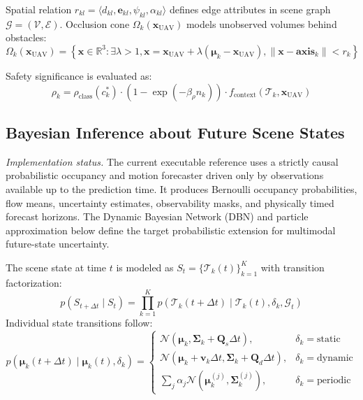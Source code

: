 Spatial relation $r_{kl} = \langle d_{kl}, \mathbf{e}_{kl}, \psi_{kl}, \alpha_{kl} \rangle$ defines edge attributes in scene graph $\mathcal{G} = (\mathcal{V}, \mathcal{E})$. Occlusion cone $\Omega_k(\mathbf{x}_{\text{UAV}})$ models unobserved volumes behind obstacles:
\begin{equation}
  \Omega_k(\mathbf{x}_{\text{UAV}}) = \left\{ \mathbf{x} \in \mathbb{R}^3 : \exists \lambda > 1, \mathbf{x} = \mathbf{x}_{\text{UAV}} + \lambda(\boldsymbol{\mu}_k - \mathbf{x}_{\text{UAV}}), \|\mathbf{x} - \mathbf{axis}_k\| < r_k \right\}
\end{equation}

Safety significance is evaluated as:
\begin{equation}
  \rho_k = \rho_{\text{class}}(c_k^*) \cdot (1 - \exp(-\beta_\rho n_k)) \cdot f_{\text{context}}(\mathcal{T}_k, \mathbf{x}_{\text{UAV}})
\end{equation}

\subsection{Bayesian Inference about Future Scene States}
\label{subsec:bayesian_inference}

\emph{Implementation status.} The current executable reference uses a strictly causal probabilistic occupancy and motion forecaster driven only by observations available up to the prediction time. It produces Bernoulli occupancy probabilities, flow means, uncertainty estimates, observability masks, and physically timed forecast horizons. The Dynamic Bayesian Network (DBN) and particle approximation below define the target probabilistic extension for multimodal future-state uncertainty.

The scene state at time $t$ is modeled as $S_t = \{\mathcal{T}_k(t)\}_{k=1}^K$ with transition factorization:
\begin{equation}
  p(S_{t+\Delta t} \mid S_t) = \prod_{k=1}^K p(\mathcal{T}_k(t+\Delta t) \mid \mathcal{T}_k(t), \delta_k, \mathcal{G}_t)
\end{equation}
Individual state transitions follow:
\begin{equation}
  p(\boldsymbol{\mu}_k(t+\Delta t) \mid \boldsymbol{\mu}_k(t), \delta_k) = \begin{cases}
    \mathcal{N}(\boldsymbol{\mu}_k, \mathbf{\Sigma}_k + \mathbf{Q}_s \Delta t), & \delta_k = \text{static} \\
    \mathcal{N}(\boldsymbol{\mu}_k + \mathbf{v}_k \Delta t, \mathbf{\Sigma}_k + \mathbf{Q}_d \Delta t), & \delta_k = \text{dynamic} \\
    \sum_j \alpha_j \mathcal{N}(\boldsymbol{\mu}_k^{(j)}, \mathbf{\Sigma}_k^{(j)}), & \delta_k = \text{periodic}
  \end{cases}
\end{equation}

